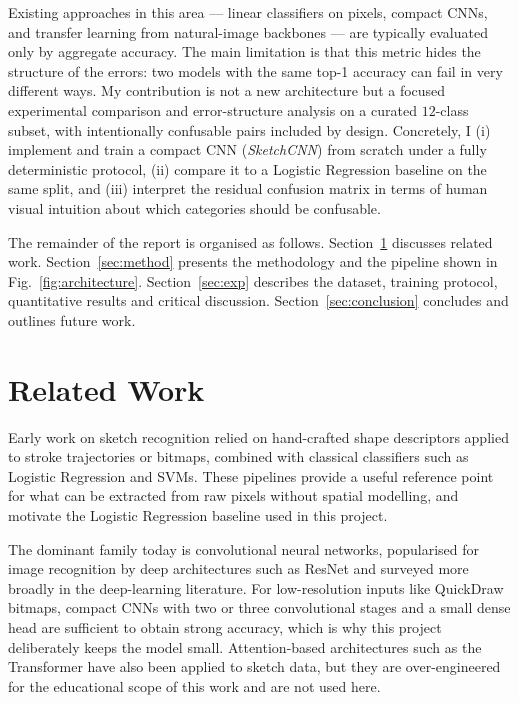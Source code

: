 \documentclass[10pt,twocolumn,a4paper]{article}
\begin{document}
Existing approaches in this area --- linear classifiers on pixels, compact
CNNs, and transfer learning from natural-image backbones
--- are typically evaluated only by aggregate accuracy. The main limitation is
that this metric hides the structure of the errors: two models with the same
top-1 accuracy can fail in very different ways. My contribution is not a new
architecture but a focused experimental comparison and error-structure
analysis on a curated $12$-class subset, with intentionally confusable pairs
included by design. Concretely, I (i) implement and train a compact CNN
(\emph{SketchCNN}) from scratch under a fully deterministic protocol,
(ii) compare it to a Logistic Regression baseline on the same split, and
(iii) interpret the residual confusion matrix in terms of human visual
intuition about which categories should be confusable.

The remainder of the report is organised as follows. Section~\ref{sec:related}
discusses related work. Section~\ref{sec:method} presents the methodology and
the pipeline shown in Fig.~\ref{fig:architecture}. Section~\ref{sec:exp}
describes the dataset, training protocol, quantitative results and critical
discussion. Section~\ref{sec:conclusion} concludes and outlines future work.

\section{Related Work}
\label{sec:related}

Early work on sketch recognition relied on hand-crafted shape descriptors
applied to stroke trajectories or bitmaps, combined with classical
classifiers such as Logistic Regression and SVMs. These pipelines provide a
useful reference point for what can be extracted from raw pixels without
spatial modelling, and motivate the Logistic Regression baseline used in this
project.

The dominant family today is convolutional neural networks, popularised for
image recognition by deep architectures such as ResNet and surveyed more
broadly in the deep-learning literature. For low-resolution inputs like
QuickDraw bitmaps, compact CNNs with two or three convolutional stages and a
small dense head are sufficient to obtain strong accuracy, which is why this
project deliberately keeps the model small. Attention-based architectures
such as the Transformer have also been applied to sketch data, but they are
over-engineered for the educational scope of this work and are not used
here.
\end{document}
